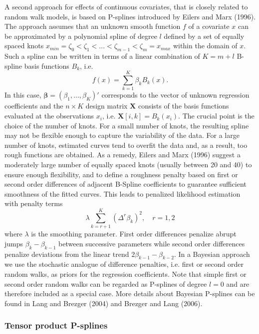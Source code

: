 \documentclass[11pt,a4paper,twoside]{bayesxarticle}
\def \betavec {\boldsymbol{\beta}}
\def \Xvec {\mathbf{X}}
\begin{document}
A second approach for effects of continuous covariates, that is
closely related to random walk models, is based on P-splines
introduced by Eilers and Marx (1996). The approach assumes that an
unknown smooth function $f$ of a covariate $x$ can be approximated
by a polynomial spline of degree $l$ defined by a set of equally
spaced knots $x_{min} = \zeta_{0}  < \zeta_{1} < \dots < \zeta_{m-1}
< \zeta_{m} = x_{max}$ within the domain of $x$. Such a spline can
be written in terms of a linear combination of $K = m+l$ B-spline
basis functions $B_{k}$, i.e.
$$
f(x) = \sum_{k=1}^{K} \beta_{k} B_{k}(x).
$$
In this case, $\betavec = (\beta_{1},\dots,\beta_{K})'$
corresponds to the vector of unknown regression coefficients and the
$n \times K$ design matrix $\Xvec$ consists of the basis functions
evaluated at the observations $x_{i}$, i.e. $\Xvec[i,k] =
B_k(x_{i})$. The crucial point is the choice of the number of
knots. For a small number of knots, the resulting spline may not be
flexible enough to capture the variability of the data. For a large
number of knots, estimated curves tend to overfit the data and, as a
result, too rough functions are obtained. As a remedy, Eilers and
Marx (1996) suggest a moderately large number of equally spaced
knots (usually between 20 and 40) to ensure enough flexibility, and
to define a roughness penalty based on first or second order
differences of adjacent B-Spline coefficients to guarantee
sufficient smoothness of the fitted curves. This leads to penalized
likelihood estimation with penalty terms
\begin{equation}
\label{diffpenalty} \lambda \sum_{k=r+1}^{K}
(\Delta^r \beta_{k})^2 , \quad r=1,2
\end{equation}
where $\lambda$ is the smoothing parameter. First order
differences penalize abrupt jumps $\beta_{k}-\beta_{k-1}$ between
successive parameters while second order differences penalize
deviations from the linear trend $2 \beta_{k-1}-\beta_{k-2}$. In
a Bayesian approach we use the stochastic analogue of difference
penalties, i.e. first or second order random walks, as priors for
the regression coefficients. Note that simple first or second order
random walks can be regarded as P-splines of degree $l=0$ and are
therefore included as a special case. More details about Bayesian
P-splines can be found in Lang and Brezger (2004) and Brezger and
Lang (2006).

\subsubsection{Tensor product P-splines}
\label{tensorproductpsplines_bayes}
\end{document}
